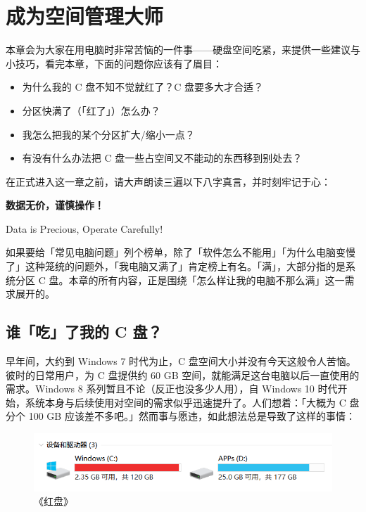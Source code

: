 \chapter{成为空间管理大师}
\label{cha:manage-storage}

\begin{intro}
  本章会为大家在用电脑时非常苦恼的一件事——硬盘空间吃紧，来提供一些建议与小技巧，看完本章，下面的问题你应该有了眉目：
  \begin{itemize}
    \item 为什么我的 C 盘不知不觉就红了？C 盘要多大才合适？
    \item 分区快满了（「红了」）怎么办？
    \item 我怎么把我的某个分区扩大/缩小一点？
    \item 有没有什么办法把 C 盘一些占空间又不能动的东西移到别处去？
  \end{itemize}
\end{intro}

在正式进入这一章之前，请大声朗读三遍以下八字真言，并时刻牢记于心：
\begin{center}
  \LARGE\bfseries
  数据无价，谨慎操作！\par
  Data is Precious, Operate Carefully!
\end{center}

如果要给「常见电脑问题」列个榜单，除了「软件怎么不能用」「为什么电脑变慢了」这种笼统的问题外，「我电脑又满了」肯定榜上有名。「满」，大部分指的是系统分区 C 盘。本章的所有内容，正是围绕「怎么样让我的电脑不那么满」这一需求展开的。

\section{谁「吃」了我的 C 盘？}

早年间，大约到 Windows 7 时代为止，C 盘空间大小并没有今天这般令人苦恼。彼时的日常用户，为 C 盘提供约 60 GB 空间，就能满足这台电脑以后一直使用的需求。Windows 8 系列暂且不论（反正也没多少人用），自 Windows 10 时代开始，系统本身与后续使用对空间的需求似乎迅速提升了。人们想着：「大概为 C 盘分个 100 GB 应该差不多吧。」然而事与愿违，如此想法总是导致了这样的事情：

\begin{figure}[htb!]
  \centering
  \includegraphics[width=.7\textwidth]{assets/advanced/Red_C_Drive.png}
  \caption{《红盘》}
  \label{fig:Red_C_Drive}
\end{figure}

